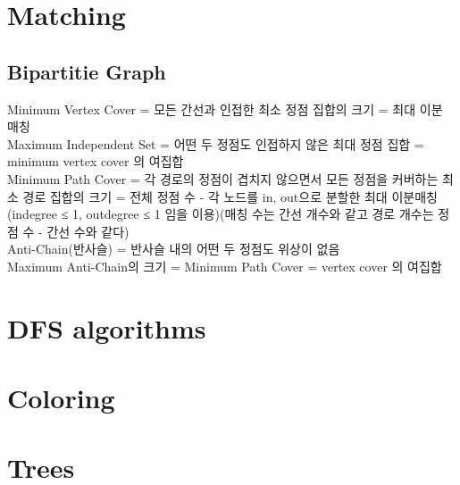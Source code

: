 \section{Matching}

	\subsection{Bipartitie Graph}
		Minimum Vertex Cover = 모든 간선과 인접한 최소 정점 집합의 크기 = 최대 이분 매칭\\
		Maximum Independent Set = 어떤 두 정점도 인접하지 않은 최대 정점 집합 = minimum vertex cover 의 여집합\\
		Minimum Path Cover = 각 경로의 정점이 겹치지 않으면서 모든 정점을 커버하는 최소 경로 집합의 크기 = 전체 정점 수 - 각 노드를 in, out으로 분할한 최대 이분매칭(indegree ≤ 1, outdegree ≤ 1 임을 이용)(매칭 수는 간선 개수와 같고 경로 개수는 정점 수 - 간선 수와 같다)\\
		Anti-Chain(반사슬) = 반사슬 내의 어떤 두 정점도 위상이 없음\\
		Maximum Anti-Chain의 크기 = Minimum Path Cover = vertex cover 의 여집합


\section{DFS algorithms}

\section{Coloring}


\section{Trees}

